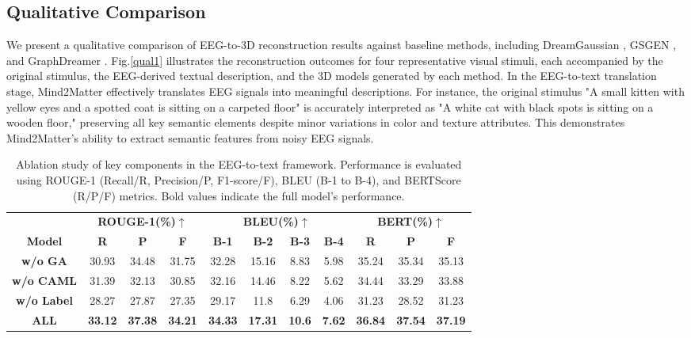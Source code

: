\documentclass[sigconf]{acmart}
\begin{document}
\subsection{Qualitative Comparison}
We present a qualitative comparison of EEG-to-3D reconstruction results against baseline methods, including DreamGaussian \cite{tang2023dreamgaussian}, GSGEN \cite{chen2024text}, and GraphDreamer \cite{gao2024graphdreamer}. Fig.\ref{qual1} illustrates the reconstruction outcomes for four representative visual stimuli, each accompanied by the original stimulus, the EEG-derived textual description, and the 3D models generated by each method. In the EEG-to-text translation stage, Mind2Matter effectively translates EEG signals into meaningful descriptions. For instance, the original stimulus "A small kitten with yellow eyes and a spotted coat is sitting on a carpeted floor" is accurately interpreted as "A white cat with black spots is sitting on a wooden floor," preserving all key semantic elements despite minor variations in color and texture attributes. This demonstrates Mind2Matter's ability to extract semantic features from noisy EEG signals.

\begin{table}[ht]
\centering
\caption{Ablation study of key components in the EEG-to-text framework. Performance is evaluated using ROUGE-1 (Recall/R, Precision/P, F1-score/F), BLEU (B-1 to B-4), and BERTScore (R/P/F) metrics. Bold values indicate the full model's performance.}
\label{quaas}
\begin{tabular}{c c c c c c c c c c c}
\toprule
& \multicolumn{3}{c}{\textbf{ROUGE-1(\%)$\uparrow$}} & \multicolumn{4}{c}{\textbf{BLEU(\%)$\uparrow$}} & 
\multicolumn{3}{c}{\textbf{BERT(\%)$\uparrow$}}\\
{\textbf{Model}} & \textbf{R} & \textbf{P} & \textbf{F} & \textbf{B-1} & \textbf{B-2} & \textbf{B-3} & \textbf{B-4} &
\textbf{R} & \textbf{P} & \textbf{F}\\
\midrule
\textbf{w/o GA} &30.93 & 34.48 & 31.75 & 32.28 & 15.16 & 8.83 & 5.98 & 35.24 & 35.34 & 35.13 \\
\textbf{w/o CAML} & 31.39 & 32.13 & 30.85 & 32.16 & 14.46 & 8.22 & 5.62 & 34.44 & 33.29 & 33.88\\
\textbf{w/o Label} & {28.27} & {27.87} & {27.35} & {29.17} & {11.8} & {6.29} & {4.06} & {31.23} & {28.52} & {31.23}\\
\textbf{ALL} & \textbf{33.12} & \textbf{37.38} & \textbf{34.21} & \textbf{34.33} & \textbf{17.31} & \textbf{10.6} & \textbf{7.62} & \textbf{36.84} & \textbf{37.54} & \textbf{37.19}\\
\bottomrule
\end{tabular}
\end{table}
\end{document}
